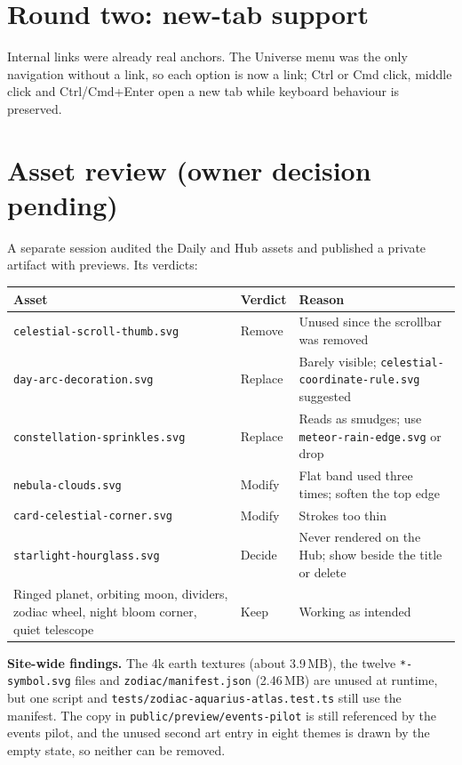 \documentclass[11pt,a4paper]{article}
\begin{document}
\section{Round two: new-tab support}
Internal links were already real anchors. The Universe menu was the only navigation without a link, so each option is now a link; Ctrl or Cmd click, middle click and Ctrl/Cmd+Enter open a new tab while keyboard behaviour is preserved.

\section{Asset review (owner decision pending)}
A separate session audited the Daily and Hub assets and published a private artifact with previews. Its verdicts:

\begin{longtable}{@{}p{5.6cm}p{1.9cm}p{7.3cm}@{}}
\toprule
Asset & Verdict & Reason \\
\midrule
\endhead
\texttt{celestial-scroll-thumb.svg} & Remove & Unused since the scrollbar was removed \\
\texttt{day-arc-decoration.svg} & Replace & Barely visible; \texttt{celestial-coordinate-rule.svg} suggested \\
\texttt{constellation-sprinkles.svg} & Replace & Reads as smudges; use \texttt{meteor-rain-edge.svg} or drop \\
\texttt{nebula-clouds.svg} & Modify & Flat band used three times; soften the top edge \\
\texttt{card-celestial-corner.svg} & Modify & Strokes too thin \\
\texttt{starlight-hourglass.svg} & Decide & Never rendered on the Hub; show beside the title or delete \\
Ringed planet, orbiting moon, dividers, zodiac wheel, night bloom corner, quiet telescope & Keep & Working as intended \\
\bottomrule
\end{longtable}

\textbf{Site-wide findings.} The 4k earth textures (about 3.9\,MB), the twelve \texttt{*-symbol.svg} files and \texttt{zodiac/manifest.json} (2.46\,MB) are unused at runtime, but one script and \texttt{tests/zodiac-aquarius-atlas.test.ts} still use the manifest. The copy in \texttt{public/preview/events-pilot} is still referenced by the events pilot, and the unused second art entry in eight themes is drawn by the empty state, so neither can be removed.
\end{document}
